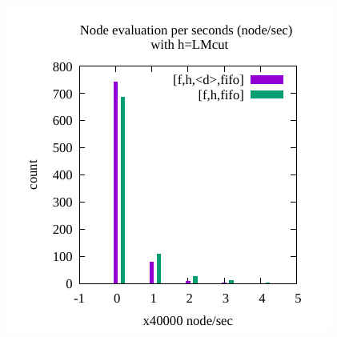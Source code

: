 \begin{figure}[htbp]
 \centering
 \includegraphics{img/node-sec/lmhiF-lmh_F-hist.pdf}

\end{figure}

